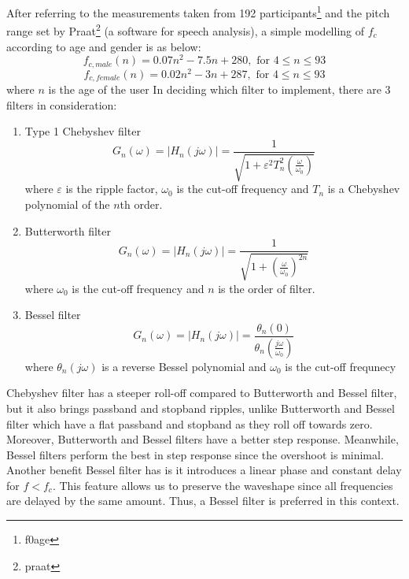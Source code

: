 After referring to the measurements taken from 192 participants\footnote{f0age} and the pitch range
set by Praat\footnote{praat} (a software for speech analysis), a simple modelling of $f_c$ according to age and gender
is as below:
\[f_{c,male}(n) = 0.07n^2 - 7.5n + 280, \text{ for } 4 \leq n\leq 93 \label{male} \] 
\[f_{c,female}(n) = 0.02n^2 - 3n + 287, \text{ for } 4 \leq n \leq 93 \label{female} \] 
where $n$ is the age of the user
In deciding which filter to implement, there are 3 filters in consideration:
\begin{enumerate}[label=(\alph*)]
    \item Type 1 Chebyshev filter
    \[G_{n}(\omega) = |H_{n}(j\omega)| = {\frac{1}{\sqrt{1+\varepsilon^{2} T_{n}^{2}(\frac{\omega}{\omega_{0}})}}}\]
    where $\varepsilon$  is the ripple factor, $\omega _{0}$ is the cut-off frequency
    and $T_{n}$ is a Chebyshev polynomial of the $n$th order.
    \item Butterworth filter
    \[G_{n}(\omega) = |H_{n}(j\omega)| = {\frac{1}{\sqrt{1+(\frac{\omega}{\omega_{0}})^{2n}}}}\]
    where $\omega _{0}$ is the cut-off frequency and $n$ is the order of filter.
    \item Bessel filter
    \[G_{n}(\omega) = |H_{n}(j\omega)| ={\frac {\theta _{n}(0)}{\theta _{n}(\frac{j\omega}{\omega _{0}})}}\]
    where $\theta _{n}(j\omega)$ is a reverse Bessel polynomial and $\omega _{0}$ is the cut-off frequnecy
\end{enumerate}

Chebyshev filter has a steeper roll-off compared to Butterworth and Bessel filter, but it also brings passband and stopband ripples, 
unlike Butterworth and Bessel filter which have a flat passband and stopband as they roll off towards zero. Moreover, Butterworth 
and Bessel filters have a better step response. Meanwhile, Bessel filters perform the best in step response since the overshoot is
minimal. Another benefit Bessel filter has is it introduces a linear phase and constant delay for $f<f_c$. This
feature allows us to preserve the waveshape since all frequencies are delayed by the same amount.
Thus, a Bessel filter is preferred in this context.

